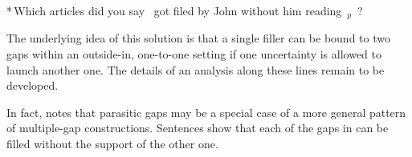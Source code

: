 \documentclass[output=paper,hidelinks]{langscibook}
\begin{document}
\ea\label{gapsubj}
*\,Which articles did you say \GAP\ got filed by John without him \mbox{reading \GAP$_p$ ?}\\
    \hsp{2em} \citep[from][]{Engdahl1983}
\z


\noindent The underlying idea of this solution is that a single filler can be bound to two gaps within an outside-in, one-to-one setting if one uncertainty is allowed to launch another one. The details of an analysis along these lines remain to be developed. 

In fact, \citet{Falk11} notes that parasitic gaps may be a special case of a more general pattern of multiple-gap constructions. Sentences  show that each of the gaps in  can be filled without the support of the other one.  

\ea\label{multigap}
\label{multigap1}
\label{multigap2}
\label{multigap3}
\z\z
\end{document}
